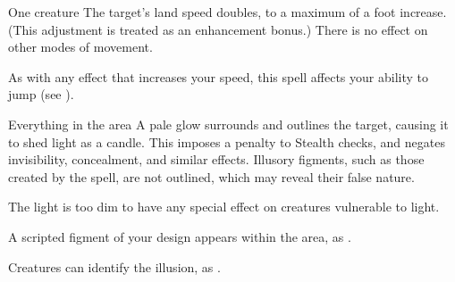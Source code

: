 \begin{spellheader}
    \spellrng{\rngclose}
    \spelldur{\durshort \dismissable}
\end{spellheader}
\begin{spelleffects}
    \begin{spelltarget}{One creature}
        \spelleffect The target's land speed doubles, to a maximum of a  foot increase. (This adjustment is treated as an enhancement bonus.) There is no effect on other modes of movement.
    \end{spelltarget}
\end{spelleffects}
\begin{spellfooter}
    \spellnotes As with any effect that increases your speed, this spell affects your ability to jump (see ).
\end{spellfooter}

\begin{comment}
\subsubsection{F}
\end{comment}

\begin{spellheader}
    \spelldur{\durshort \dismissable}
\end{spellheader}
\begin{spelleffects}
    \begin{spelltarget}{Everything in the area}
        \spelleffect A pale glow surrounds and outlines the target, causing it to shed light as a candle. This imposes a  penalty to Stealth checks, and negates invisibility, concealment, and similar effects. Illusory figments, such as those created by the  spell, are not outlined, which may reveal their false nature.
    \end{spelltarget}
\end{spelleffects}
\begin{spellfooter}
    \spellnotes The light is too dim to have any special effect on creatures vulnerable to light.
\end{spellfooter}

\begin{spellheader}
    \spelldur{\durlong \dismissable}
\end{spellheader}
\begin{spelleffects}
    \spellline
    \spelleffect A scripted figment of your design appears within the area, as .
\end{spelleffects}
\begin{spellfooter}
    \spellnotes Creatures can identify the illusion, as .
\end{spellfooter}

